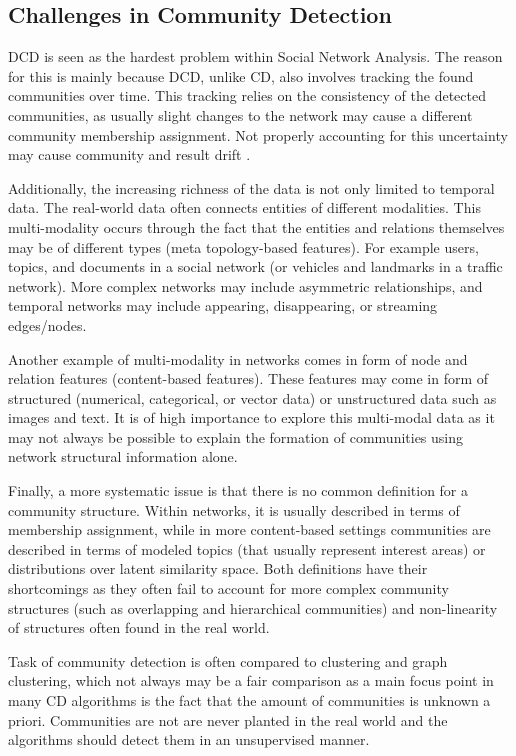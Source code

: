 \documentclass[
acmsmall,
nonacm,
screen,
acmthm]{../../scripts/pandoc/templates/acmart}
\begin{document}
\hypertarget{challenges-in-community-detection}{%
\subsection{Challenges in Community
Detection}\label{challenges-in-community-detection}}

DCD is seen as the hardest problem within Social Network Analysis. The
reason for this is mainly because DCD, unlike CD, also involves tracking
the found communities over time. This tracking relies on the consistency
of the detected communities, as usually slight changes to the network
may cause a different community membership assignment. Not properly
accounting for this uncertainty may cause community and result drift
\citep{dakicheTrackingCommunityEvolution2019}.

Additionally, the increasing richness of the data is not only limited to
temporal data. The real-world data often connects entities of different
modalities. This multi-modality occurs through the fact that the
entities and relations themselves may be of different types (meta
topology-based features). For example users, topics, and documents in a
social network (or vehicles and landmarks in a traffic network). More
complex networks may include asymmetric relationships, and temporal
networks may include appearing, disappearing, or streaming edges/nodes.

Another example of multi-modality in networks comes in form of node and
relation features (content-based features). These features may come in
form of structured (numerical, categorical, or vector data) or
unstructured data such as images and text. It is of high importance to
explore this multi-modal data as it may not always be possible to
explain the formation of communities using network structural
information alone.

Finally, a more systematic issue is that there is no common definition
for a community structure. Within networks, it is usually described in
terms of membership assignment, while in more content-based settings
communities are described in terms of modeled topics (that usually
represent interest areas) or distributions over latent similarity space.
Both definitions have their shortcomings as they often fail to account
for more complex community structures (such as overlapping and
hierarchical communities) and non-linearity of structures often found in
the real world.

Task of community detection is often compared to clustering and graph
clustering, which not always may be a fair comparison as a main focus
point in many CD algorithms is the fact that the amount of communities
is unknown a priori. Communities are not are never planted in the real
world and the algorithms should detect them in an unsupervised manner.
\end{document}
